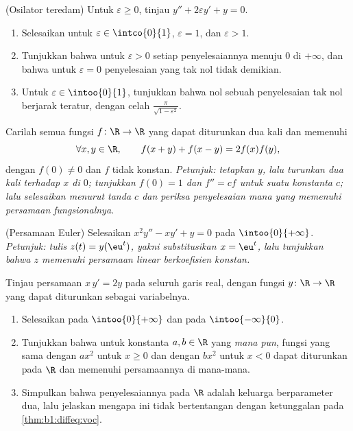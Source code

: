 \begin{exercise}[$\star\star\star$]\label{exo:b1:diffeq:9}
(Osilator teredam) Untuk $\varepsilon \geq 0$, tinjau
$y'' + 2\varepsilon y' + y = 0$.
\begin{enumerate}
  \item Selesaikan untuk $\varepsilon \in \intco{0}{1}$, $\varepsilon = 1$,
        dan $\varepsilon > 1$.
  \item Tunjukkan bahwa untuk $\varepsilon > 0$ setiap penyelesaiannya menuju $0$
        di $+\infty$, dan bahwa untuk $\varepsilon = 0$ penyelesaian yang tak
        nol tidak demikian.
  \item Untuk $\varepsilon \in \intoo{0}{1}$, tunjukkan bahwa nol sebuah
        penyelesaian tak nol berjarak teratur, dengan celah
        $\frac{\pi}{\sqrt{1 - \varepsilon^2}}$.
\end{enumerate}
\end{exercise}

\begin{exercise}[$\star\star\star$]\label{exo:b1:diffeq:10}
Carilah semua fungsi $f \colon \R \to \R$ yang dapat diturunkan dua kali dan
memenuhi
\[
\forall x, y \in \R, \qquad f(x + y) + f(x - y) = 2 f(x) f(y),
\]
dengan $f(0) \ne 0$ dan $f$ tidak konstan.
\emph{Petunjuk: tetapkan $y$, lalu turunkan dua kali terhadap $x$ di $0$;
tunjukkan $f(0) = 1$ dan $f'' = c f$ untuk suatu konstanta $c$; lalu selesaikan
menurut tanda $c$ dan periksa penyelesaian mana yang memenuhi
persamaan fungsionalnya.}
\end{exercise}

\begin{exercise}[$\star\star$]\label{exo:b1:diffeq:11}
(Persamaan Euler) Selesaikan $x^2 y'' - x y' + y = 0$ pada
$\intoo{0}{+\infty}$. \emph{Petunjuk: tulis $z(t) = y(\eu^t)$, yakni
substitusikan $x = \eu^t$, lalu tunjukkan bahwa $z$ memenuhi persamaan
linear berkoefisien konstan.}
\end{exercise}

\begin{exercise}[$\star\star\star$]\label{exo:b1:diffeq:12}
Tinjau persamaan $x\,y' = 2y$ pada seluruh garis real, dengan
fungsi $y \colon \R \to \R$ yang dapat diturunkan sebagai variabelnya.
\begin{enumerate}
  \item Selesaikan pada $\intoo{0}{+\infty}$ dan pada $\intoo{-\infty}{0}$.
  \item Tunjukkan bahwa untuk konstanta $a, b \in \R$ yang \emph{mana pun},
        fungsi yang sama dengan $ax^2$ untuk $x \geq 0$ dan dengan $bx^2$ untuk
        $x < 0$ dapat diturunkan pada $\R$ dan memenuhi persamaannya
        di mana-mana.
  \item Simpulkan bahwa  penyelesaiannya pada $\R$ adalah keluarga
        berparameter dua, lalu jelaskan mengapa ini tidak bertentangan dengan
        ketunggalan pada \cref{thm:b1:diffeq:voc}.
\end{enumerate}
\end{exercise}

